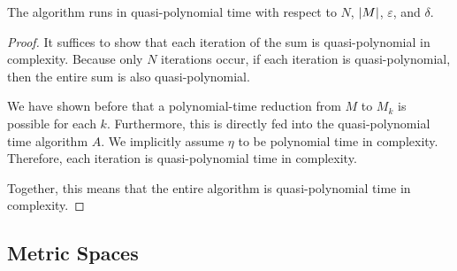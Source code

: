 \documentclass[12pt]{article}
\begin{document}
\begin{theorem}
  The algorithm runs in quasi-polynomial time with respect to
  \(N\), \(\left\lvert M\right\rvert\), \(\varepsilon\), and \(\delta\).
\end{theorem}
\begin{proof}
  It suffices to show that each iteration of the sum is
  quasi-polynomial in complexity.
  Because only \(N\) iterations occur,
  if each iteration is quasi-polynomial,
  then the entire sum is also quasi-polynomial.

  We have shown before that a polynomial-time reduction from
  \(M\) to \(M_k\) is possible for each \(k\).
  Furthermore, this is directly fed into the
  quasi-polynomial time algorithm \(A\).
  We implicitly assume \(\eta\) to be polynomial time in complexity.
  Therefore, each iteration is quasi-polynomial time in complexity.

  Together, this means that the entire algorithm is
  quasi-polynomial time in complexity.
\end{proof}


\subsection{Metric Spaces}
\end{document}
